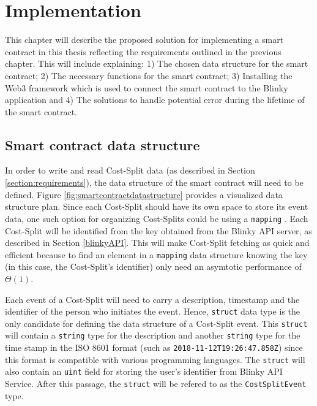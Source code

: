 \chapter{Implementation}
\label{ch:implementation}

This chapter will describe the proposed solution for implementing a smart contract in this thesis reflecting the requirements outlined in the previous chapter. This will include explaining: 1) The chosen data structure for the smart contract; 2) The necessary functions for the smart contract; 3) Installing the Web3 framework which is used to connect the smart contract to the Blinky application and 4) The solutions to handle potential error during the lifetime of the smart contract.

\section{Smart contract data structure}
\label{section:DataStructure}

In order to write and read Cost-Split data (as described in Section \ref{section:requirements}), the data structure of the smart contract will need to be defined. Figure \ref{fig:smartcontractdatastructure} provides a visualized data structure plan. Since each Cost-Split should have its own space to store its event data, one such option for organizing Cost-Splits could be using a \texttt{mapping} \citep{SolidityMapping}. Each Cost-Split will be identified from the key obtained from the Blinky API server, as described in Section \ref{blinkyAPI}. This will make Cost-Split fetching as quick and efficient because to find an element in a \texttt{mapping} data structure knowing the key (in this case, the Cost-Split's identifier) only need an asymtotic performance of $\Theta(1)$. 

Each event of a Cost-Split will need to carry a description, timestamp and the identifier of the person who initiates the event. Hence, \texttt{struct} data type is the only candidate for defining the data structure of a Cost-Split event. This \texttt{struct} will contain a \texttt{string} type for the description and another \texttt{string} type for the time stamp in the ISO 8601 format \citep{ISOFormat} (such as \texttt{2018-11-12T19:26:47.858Z}) since this format is compatible with various programming languages. The \texttt{struct} will also contain an \texttt{uint} field for storing the user's identifier from Blinky API Service. After this passage, the \texttt{struct} will be refered to as the \texttt{CostSplitEvent} type.
\label{DataStructure}

